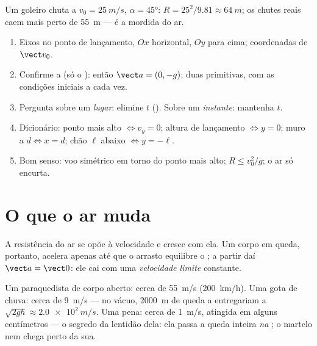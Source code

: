 \begin{example}\label{ex:g12:projectile-motion:kick}
Um goleiro chuta a $v_0 = \qty{25}{m/s}$, $\alpha = \ang{45}$:
$R = 25^2/9.81 \approx \qty{64}{m}$; os chutes reais caem mais perto de \qty{55}{m}
--- é a mordida do ar.
\end{example}

\begin{method}\label{met:g12:projectile-motion:method}
\begin{enumerate}
  \item Eixos no ponto de lançamento, $Ox$ horizontal, $Oy$ para cima; coordenadas de
        $\vect v_0$.
  \item Confirme a  (só o ): então $\vect a = (0,-g)$; duas primitivas,
        com as condições iniciais a cada vez.
  \item Pergunta sobre um \emph{lugar}: elimine $t$ (). Sobre um
        \emph{instante}: mantenha $t$.
  \item Dicionário: ponto mais alto $\Leftrightarrow v_y = 0$; altura de lançamento
        $\Leftrightarrow y = 0$; muro a $d \Leftrightarrow x = d$; chão $\ell$ abaixo
        $\Leftrightarrow y = -\ell$.
  \item Bom senso: voo simétrico em torno do ponto mais alto; $R \leq v_0^2/g$; o ar
        só encurta.
\end{enumerate}
\end{method}

\section{O que o ar muda}

\begin{definition}\label{def:g12:projectile-motion:terminal}
A resistência do ar se opõe à velocidade e cresce com ela. Um corpo em queda,
portanto, acelera apenas até que o arrasto equilibre o ; a partir daí
$\vect a = \vect 0$: ele cai com uma \emph{velocidade limite}
constante.
\end{definition}

\begin{example}\label{ex:g12:projectile-motion:airorders}
Um paraquedista de corpo aberto: cerca de \qty{55}{m/s} (\qty{200}{km/h}). Uma gota de
chuva: cerca de \qty{9}{m/s} --- no vácuo, \qty{2000}{m} de queda a entregariam a
$\sqrt{2gh} \approx \qty{2.0e2}{m/s}$. Uma pena: cerca de \qty{1}{m/s}, atingida em
alguns centímetros --- o segredo da lentidão dela: ela passa a queda inteira \emph{na}
; o martelo nem chega perto da sua.
\end{example}

